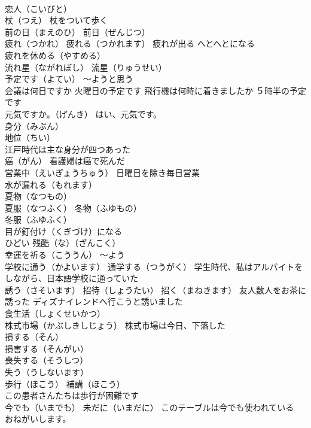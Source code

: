 \documentclass[8pt]{extreport}
\begin{document}
\begin{CJK}{UTF8}{min}
\\	恋人（こいびと）
\\	杖（つえ） 杖をついて歩く
\\	前の日（まえのひ） 前日（ぜんじつ）
\\	疲れ（つかれ） 疲れる（つかれます） 疲れが出る へとへとになる 
\\	疲れを休める（やすめる）
\\	流れ星（ながれぼし） 流星（りゅうせい）
\\	予定です（よてい） ～ようと思う 
\\	会議は何日ですか 火曜日の予定です 飛行機は何時に着きましたか ５時半の予定です
\\	元気ですか。（げんき） はい、元気です。
\\	身分（みぶん）
\\	地位（ちい）
\\	江戸時代は主な身分が四つあった
\\	癌（がん） 看護婦は癌で死んだ
\\	営業中（えいぎょうちゅう） 日曜日を除き毎日営業
\\	水が漏れる（もれます）
\\	夏物（なつもの）
\\	夏服（なつふく） 冬物（ふゆもの）
\\	冬服（ふゆふく）
\\	目が釘付け（くぎづけ）になる
\\	ひどい 残酷（な）（ざんこく）
\\	幸運を祈る（こううん） ～よう
\\	学校に通う（かよいます） 通学する（つうがく） 学生時代、私はアルバイトをしながら、日本語学校に通っていた
\\	誘う（さそいます） 招待（しょうたい） 招く（まねきます） 友人数人をお茶に誘った ディズナイレンドへ行こうと誘いました
\\	食生活（しょくせいかつ）
\\	株式市場（かぶしきしじょう） 株式市場は今日、下落した
\\	損する（そん）
\\	損害する（そんがい） 
\\	喪失する（そうしつ） 
\\	失う（うしないます）
\\	歩行（ほこう） 補講（ほこう）
\\	この患者さんたちは歩行が困難です
\\	今でも（いまでも） 未だに（いまだに） このテーブルは今でも使われている
\\	おねがいします。

\end{CJK}
\end{document}
